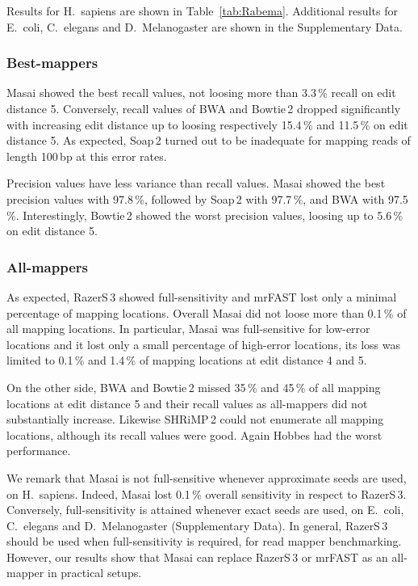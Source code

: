 Results for H.~sapiens are shown in Table~\ref{tab:Rabema}.
Additional results for E.~coli, C.~elegans and D.~Melanogaster are shown in the Supplementary Data.

\subsubsection{Best-mappers}
Masai showed the best recall values, not loosing more than 3.3\,\% recall on edit distance 5.
Conversely, recall values of BWA and Bowtie\,2 dropped significantly with increasing edit distance up to loosing respectively 15.4\,\% and 11.5\,\% on edit distance 5.
As expected, Soap\,2 turned out to be inadequate for mapping reads of length 100\,bp at this error rates.

Precision values have less variance than recall values. Masai showed the best precision values with 97.8\,\%, followed by Soap\,2 with 97.7\,\%, and BWA with 97.5\,\%. Interestingly, Bowtie\,2 showed the worst precision values, loosing up to 5.6\,\% on edit distance 5.

\subsubsection{All-mappers}
As expected, RazerS\,3 showed full-sensitivity and mrFAST lost only a minimal percentage of mapping locations.
Overall Masai did not loose more than 0.1\,\% of all mapping locations.
In particular, Masai was full-sensitive for low-error locations and it lost only a small percentage of high-error locations, \ie its loss was limited to 0.1\,\% and 1.4\,\% of mapping locations at edit distance 4 and 5.

On the other side, BWA and Bowtie\,2 missed 35\,\% and 45\,\% of all mapping locations at edit distance 5 and their recall values as all-mappers did not substantially increase.
Likewise SHRiMP\,2 could not enumerate all mapping locations, although its recall values were good.
Again Hobbes had the worst performance.

We remark that Masai is not full-sensitive whenever approximate seeds are used, \eg on H.~sapiens. Indeed, Masai lost 0.1\,\% overall sensitivity in respect to RazerS\,3. Conversely, full-sensitivity is attained whenever exact seeds are used, \eg on E.~coli, C.~elegans and D.~Melanogaster (Supplementary Data).
In general, RazerS\,3 should be used when full-sensitivity is required, \ie for read mapper benchmarking. However, our results show that Masai can replace RazerS\,3 or mrFAST as an all-mapper in practical setups.

